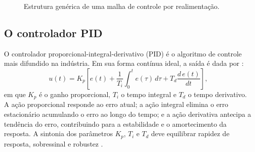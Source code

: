 \begin{figure}[htbp]
\centering
{}
\caption{Estrutura gen\'erica de uma malha de controle por realimenta\c{c}\~ao.}
\label{fig:malha}
\par\vspace{2pt}{\footnotesize Fonte: elaborada pelo autor.}
\end{figure}

\subsection{O controlador PID}

O controlador proporcional-integral-derivativo (PID) \'e o algoritmo de controle
mais difundido na ind\'ustria. Em sua forma cont\'inua ideal, a sa\'ida \'e dada
por \cite{astrom2006, ogata2010}:
\begin{equation}
  u(t) = K_p \left[ e(t) + \frac{1}{T_i}\int_0^t e(\tau)\,d\tau
         + T_d \frac{d\,e(t)}{dt} \right],
  \label{eq:pid}
\end{equation}
em que $K_p$ \'e o ganho proporcional, $T_i$ o tempo integral e $T_d$ o tempo
derivativo. A a\c{c}\~ao proporcional responde ao erro atual; a a\c{c}\~ao
integral elimina o erro estacion\'ario acumulando o erro ao longo do tempo; e a
a\c{c}\~ao derivativa antecipa a tend\^encia do erro, contribuindo para a
estabilidade e o amortecimento da resposta. A sintonia dos par\^ametros $K_p$,
$T_i$ e $T_d$ deve equilibrar rapidez de resposta, sobressinal e robustez
\cite{astrom2006}.

